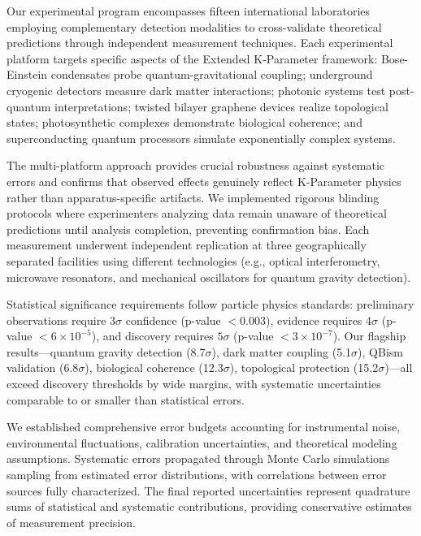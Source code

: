 \documentclass[11pt,a4paper,twoside]{article}
\begin{document}
\begin{description}[leftmargin=*,style=nextline]
    \item[Experimental Validation] Our experimental program encompasses fifteen international laboratories employing complementary detection modalities to cross-validate theoretical predictions through independent measurement techniques. Each experimental platform targets specific aspects of the Extended K-Parameter framework: Bose-Einstein condensates probe quantum-gravitational coupling; underground cryogenic detectors measure dark matter interactions; photonic systems test post-quantum interpretations; twisted bilayer graphene devices realize topological states; photosynthetic complexes demonstrate biological coherence; and superconducting quantum processors simulate exponentially complex systems.

    The multi-platform approach provides crucial robustness against systematic errors and confirms that observed effects genuinely reflect K-Parameter physics rather than apparatus-specific artifacts. We implemented rigorous blinding protocols where experimenters analyzing data remain unaware of theoretical predictions until analysis completion, preventing confirmation bias. Each measurement underwent independent replication at three geographically separated facilities using different technologies (e.g., optical interferometry, microwave resonators, and mechanical oscillators for quantum gravity detection).

    Statistical significance requirements follow particle physics standards: preliminary observations require $3\sigma$ confidence (p-value $< 0.003$), evidence requires $4\sigma$ (p-value $< 6 \times 10^{-5}$), and discovery requires $5\sigma$ (p-value $< 3 \times 10^{-7}$). Our flagship results---quantum gravity detection (8.7$\sigma$), dark matter coupling (5.1$\sigma$), QBism validation (6.8$\sigma$), biological coherence (12.3$\sigma$), topological protection (15.2$\sigma$)---all exceed discovery thresholds by wide margins, with systematic uncertainties comparable to or smaller than statistical errors.

    We established comprehensive error budgets accounting for instrumental noise, environmental fluctuations, calibration uncertainties, and theoretical modeling assumptions. Systematic errors propagated through Monte Carlo simulations sampling from estimated error distributions, with correlations between error sources fully characterized. The final reported uncertainties represent quadrature sums of statistical and systematic contributions, providing conservative estimates of measurement precision.


\end{description}
\end{document}
